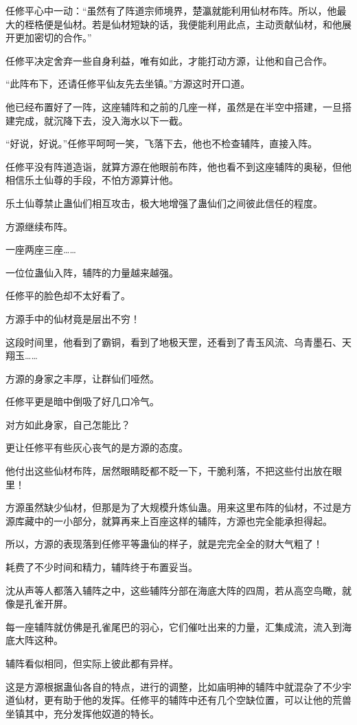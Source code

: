 \begin{this_body}
任修平心中一动：“虽然有了阵道宗师境界，楚瀛就能利用仙材布阵。所以，他最大的桎梏便是仙材。若是仙材短缺的话，我便能利用此点，主动贡献仙材，和他展开更加密切的合作。”

任修平决定舍弃一些自身利益，唯有如此，才能打动方源，让他和自己合作。

“此阵布下，还请任修平仙友先去坐镇。”方源这时开口道。

他已经布置好了一阵，这座辅阵和之前的几座一样，虽然是在半空中搭建，一旦搭建完成，就沉降下去，没入海水以下一截。

“好说，好说。”任修平呵呵一笑，飞落下去，他也不检查辅阵，直接入阵。

任修平没有阵道造诣，就算方源在他眼前布阵，他也看不到这座辅阵的奥秘，但他相信乐土仙尊的手段，不怕方源算计他。

乐土仙尊禁止蛊仙们相互攻击，极大地增强了蛊仙们之间彼此信任的程度。

方源继续布阵。

一座两座三座……

一位位蛊仙入阵，辅阵的力量越来越强。

任修平的脸色却不太好看了。

方源手中的仙材竟是层出不穷！

这段时间里，他看到了霸铜，看到了地极天罡，还看到了青玉风流、乌青墨石、天翔玉……

方源的身家之丰厚，让群仙们哑然。

任修平更是暗中倒吸了好几口冷气。

对方如此身家，自己怎能比？

更让任修平有些灰心丧气的是方源的态度。

他付出这些仙材布阵，居然眼睛眨都不眨一下，干脆利落，不把这些付出放在眼里！

方源虽然缺少仙材，但那是为了大规模升炼仙蛊。用来这里布阵的仙材，不过是方源库藏中的一小部分，就算再来上百座这样的辅阵，方源也完全能承担得起。

所以，方源的表现落到任修平等蛊仙的样子，就是完完全全的财大气粗了！

耗费了不少时间和精力，辅阵终于布置妥当。

沈从声等人都落入辅阵之中，这些辅阵分部在海底大阵的四周，若从高空鸟瞰，就像是孔雀开屏。

每一座辅阵就仿佛是孔雀尾巴的羽心，它们催吐出来的力量，汇集成流，流入到海底大阵这种。

辅阵看似相同，但实际上彼此都有异样。

这是方源根据蛊仙各自的特点，进行的调整，比如庙明神的辅阵中就混杂了不少宇道仙材，更有助于他的发挥。任修平的辅阵中还有几个空缺位置，可以让他的荒兽坐镇其中，充分发挥他奴道的特长。


\end{this_body}

